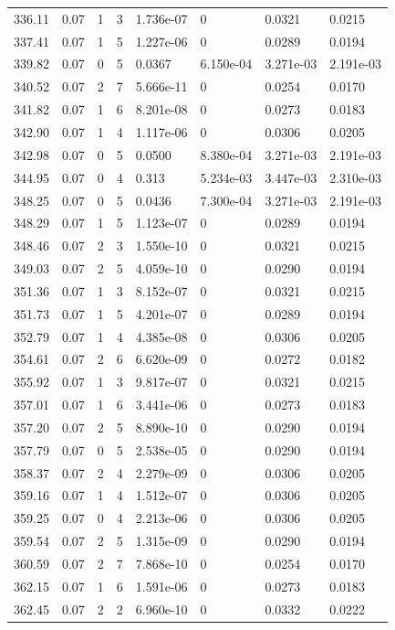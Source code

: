 \documentclass[preview]{standalone}
\begin{document}
{{{{{{{{{\begin{tabular}{L{1.2cm}C{1.2cm} C{0.3cm}C{0.5cm} C{1.4cm}C{1.4cm} C{1.4cm}C{1.4cm}}
  336.11  &  0.07  & 1     &  3 &  1.736e-07  & 0  & 0.0321 &  0.0215   \\ 
  337.41  &  0.07  & 1     &  5 &  1.227e-06  & 0  & 0.0289 &  0.0194   \\ 
  339.82  &  0.07  & 0     &  5 &  0.0367  & 6.150e-04  & 3.271e-03 &  2.191e-03   \\ 
  340.52  &  0.07  & 2     &  7 &  5.666e-11  & 0  & 0.0254 &  0.0170   \\ 
  341.82  &  0.07  & 1     &  6 &  8.201e-08  & 0  & 0.0273 &  0.0183   \\ 
  342.90  &  0.07  & 1     &  4 &  1.117e-06  & 0  & 0.0306 &  0.0205   \\ 
  342.98  &  0.07  & 0     &  5 &  0.0500  & 8.380e-04  & 3.271e-03 &  2.191e-03   \\ 
  344.95  &  0.07  & 0     &  4 &  0.313  & 5.234e-03  & 3.447e-03 &  2.310e-03   \\ 
  348.25  &  0.07  & 0     &  5 &  0.0436  & 7.300e-04  & 3.271e-03 &  2.191e-03   \\ 
  348.29  &  0.07  & 1     &  5 &  1.123e-07  & 0  & 0.0289 &  0.0194   \\ 
  348.46  &  0.07  & 2     &  3 &  1.550e-10  & 0  & 0.0321 &  0.0215   \\ 
  349.03  &  0.07  & 2     &  5 &  4.059e-10  & 0  & 0.0290 &  0.0194   \\ 
  351.36  &  0.07  & 1     &  3 &  8.152e-07  & 0  & 0.0321 &  0.0215   \\ 
  351.73  &  0.07  & 1     &  5 &  4.201e-07  & 0  & 0.0289 &  0.0194   \\ 
  352.79  &  0.07  & 1     &  4 &  4.385e-08  & 0  & 0.0306 &  0.0205   \\ 
  354.61  &  0.07  & 2     &  6 &  6.620e-09  & 0  & 0.0272 &  0.0182   \\ 
  355.92  &  0.07  & 1     &  3 &  9.817e-07  & 0  & 0.0321 &  0.0215   \\ 
  357.01  &  0.07  & 1     &  6 &  3.441e-06  & 0  & 0.0273 &  0.0183   \\ 
  357.20  &  0.07  & 2     &  5 &  8.890e-10  & 0  & 0.0290 &  0.0194   \\ 
  357.79  &  0.07  & 0     &  5 &  2.538e-05  & 0  & 0.0290 &  0.0194   \\ 
  358.37  &  0.07  & 2     &  4 &  2.279e-09  & 0  & 0.0306 &  0.0205   \\ 
  359.16  &  0.07  & 1     &  4 &  1.512e-07  & 0  & 0.0306 &  0.0205   \\ 
  359.25  &  0.07  & 0     &  4 &  2.213e-06  & 0  & 0.0306 &  0.0205   \\ 
  359.54  &  0.07  & 2     &  5 &  1.315e-09  & 0  & 0.0290 &  0.0194   \\ 
  360.59  &  0.07  & 2     &  7 &  7.868e-10  & 0  & 0.0254 &  0.0170   \\ 
  362.15  &  0.07  & 1     &  6 &  1.591e-06  & 0  & 0.0273 &  0.0183   \\ 
  362.45  &  0.07  & 2     &  2 &  6.960e-10  & 0  & 0.0332 &  0.0222   \\ 
\hline 
\end{tabular} 

}}}}}}}}}
\end{document}
